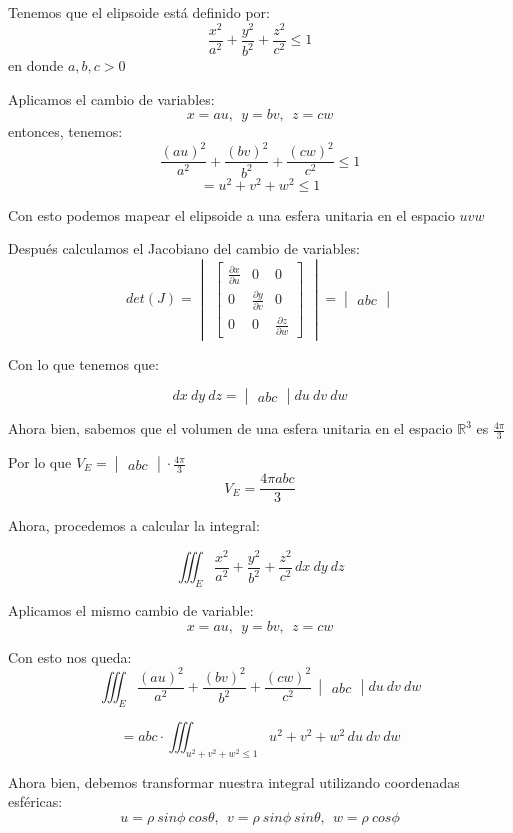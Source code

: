 Tenemos que el elipsoide está definido por:
$$\frac{x^2}{a^2} + \frac{y^2}{b^2} + \frac{z^2}{c^2} \leq 1$$
en donde $a, b, c > 0$

Aplicamos el cambio de variables:
$$x = au, \ \ y = bv, \ \ z = cw$$
entonces, tenemos:
$$\frac{(au)^2}{a^2} + \frac{(bv)^2}{b^2} + \frac{(cw)^2}{c^2} \leq 1$$
$$= u^2 + v^2 + w^2 \leq 1$$

Con esto podemos mapear el elipsoide a una esfera unitaria en el espacio $uvw$

Después calculamos el Jacobiano del cambio de variables:
$$det(J) = \begin{vmatrix}
    \begin{bmatrix}
        \frac{\partial x}{\partial u} & 0 & 0\\
        0 & \frac{\partial y}{\partial v} & 0\\
        0 & 0 & \frac{\partial z}{\partial w}
    \end{bmatrix}
\end{vmatrix} = \begin{vmatrix}
    abc
\end{vmatrix}$$

Con lo que tenemos que:

$$dx \ dy \ dz = \begin{vmatrix}
    abc
\end{vmatrix} du \ dv \ dw$$

Ahora bien, sabemos que el volumen de una esfera unitaria en el espacio $\mathbb{R}^3$ es $\frac{4\pi}{3}$

Por lo que $V_E = \begin{vmatrix}
    abc
\end{vmatrix} \cdot \frac{4\pi}{3}$
$$V_E = \frac{4\pi abc}{3}$$

Ahora, procedemos a calcular la integral:

$$\iiint_E \frac{x^2}{a^2} + \frac{y^2}{b^2} + \frac{z^2}{c^2}\, dx \ dy \ dz$$

Aplicamos el mismo cambio de variable:
$$x = au, \ \ y = bv, \ \ z = cw$$

Con esto nos queda:
$$\iiint_E \frac{(au)^2}{a^2} + \frac{(bv)^2}{b^2} + \frac{(cw)^2}{c^2}\, \begin{vmatrix}
    abc
\end{vmatrix} du \ dv \ dw$$

$$= abc \cdot \iiint_{u^2 + v^2 + w^2 \leq 1} u^2 + v^2 + w^2 \, du \ dv \ dw$$

Ahora bien, debemos transformar nuestra integral utilizando coordenadas esféricas:
$$u = \rho \ sin \phi \ cos \theta, \ \ v = \rho \ sin \phi \ sin \theta, \ \ w = \rho \ cos \phi$$

